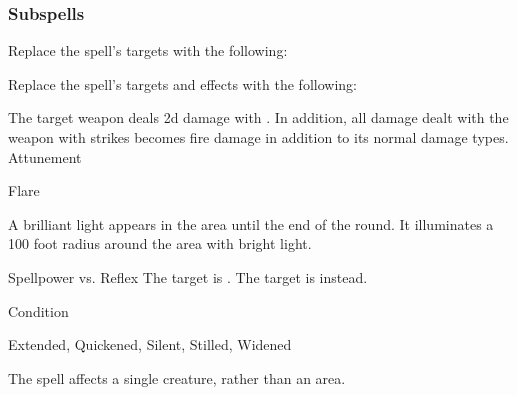 \subsubsection{Subspells}
Replace the spell's targets with the following:
\begin{spellcontent}
\begin{augmenttargetinginfo}
\end{augmenttargetinginfo}
\end{spellcontent}
Replace the spell's targets and effects with the following:
\begin{spellcontent}
\begin{augmenttargetinginfo}
\end{augmenttargetinginfo}
\begin{augmenteffects}
\spelleffect
The target weapon deals \plus2d damage with .
In addition, all damage dealt with the weapon with strikes becomes fire damage in addition to its normal damage types.
\spelldur Attunement
\end{augmenteffects}
\end{spellcontent}
\begin{spellsection}{Flare}
\begin{spellcontent}
\begin{spelltargetinginfo}
\end{spelltargetinginfo}
\begin{spelleffects}
\spelleffect
A brilliant light appears in the area until the end of the round.
It illuminates a 100 foot radius around the area with bright light.
\begin{spellattack}{Spellpower vs. Reflex}
\spellsuccess
The target is \partiallyblinded.
\spellcritical
The target is \blinded instead.
\end{spellattack}
\spelldur Condition
\end{spelleffects}
\end{spellcontent}
\begin{spellfooter}
 Extended, Quickened, Silent, Stilled, Widened
\end{spellfooter}
\begin{spellsubcontent}
\begin{spellcantrip}
The spell affects a single creature, rather than an area.
\end{spellcantrip}
\end{spellsubcontent}
\end{spellsection}
